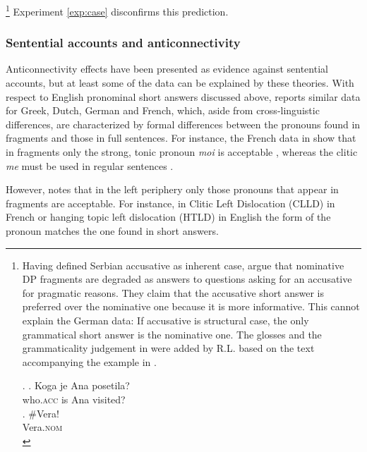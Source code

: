 %
\footnote{\label{fn:defaultcase-acc-pragmatics}Having defined Serbian accusative as inherent case, \citet[340]{progovac.etal2006} argue that nominative DP fragments are degraded as answers to questions asking for an accusative \Next for pragmatic reasons. They claim that the accusative short answer is preferred over the nominative one because it is more informative. This cannot explain the German data: If accusative is structural case, the only grammatical short answer is the nominative one. The glosses and the grammaticality judgement in \Next[b] were added by  R.L. based on the text accompanying the example in \citet{progovac.etal2006}.

\ex. \label{ex:accusative-inherent-progovac} \ag. Koga je Ana posetila?\\
who.\textsc{acc} is Ana visited? \\
\hfill {}
\bg. \#Vera!\\
Vera.\textsc{nom}\\

}\afterfn%
%
Experiment \ref{exp:case} disconfirms this prediction.

\subsubsection{Sentential accounts and anticonnectivity}
Anticonnectivity effects have been presented as evidence against sentential accounts, but at least some of the data can be explained by these theories. With respect to English pronominal short answers discussed above, \citet[700--704]{merchant2004} reports similar data for Greek, Dutch, German and French, which, aside from cross-linguistic differences, are characterized by formal differences between the pronouns found in fragments and those in full sentences. For instance, the French data in \Next show that in fragments only the strong, tonic pronoun \textit{moi} is acceptable \Next[a], whereas the clitic \textit{me} must be used in regular sentences \Next[b].

However, \citeauthor{merchant2004} notes that in the left periphery only those pronouns that appear in fragments are acceptable. For instance, in Clitic Left Dislocation (CLLD) in French \NNext[a] or hanging topic left dislocation (HTLD) in English \NNext[b] the form of the pronoun matches the one found in short answers.

